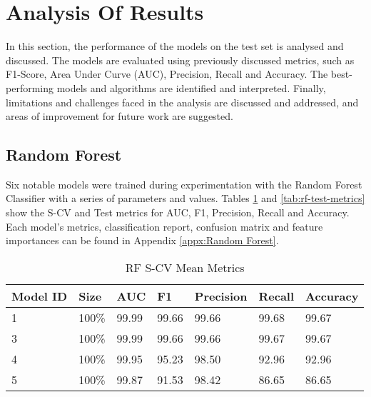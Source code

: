 
\section{Analysis Of Results}
 \label{sec: Analysis Of Results}

In this section, the performance of the models on the test set is analysed and discussed. The models are evaluated using previously discussed metrics, such as F1-Score, Area Under Curve (AUC), Precision, Recall and Accuracy. The best-performing models and algorithms are identified and interpreted. Finally, limitations and challenges faced in the analysis are discussed and addressed, and areas of improvement for future work are suggested.


\subsection{Random Forest}

Six notable models were trained during experimentation with the Random Forest Classifier with a series of parameters and values. Tables \ref{tab:rf-scv-metrics} and \ref{tab:rf-test-metrics} show the S-CV and Test metrics for AUC, F1, Precision, Recall and Accuracy. Each model's metrics, classification report, confusion matrix and feature importances can be found in Appendix \ref{appx:Random Forest}.
 
\begin{table}[H]
\centering
\caption{RF S-CV Mean Metrics}
\label{tab:rf-scv-metrics}
\begin{tabular}{|l|l|l|l|l|l|l|}
\hline
\textbf{Model ID} & \textbf{Size} & \textbf{AUC} & \textbf{F1} & \textbf{Precision} & \textbf{Recall} & \textbf{Accuracy}  \\ \hline
1 & 100\% & 99.99 & 99.66 & 99.66 & 99.68 & 99.67 \\ \hline
3 & 100\% & 99.99 & 99.66 & 99.66 & 	99.67 &	99.67 \\ \hline
4 & 100\% & 99.95 & 95.23 &	98.50 &	92.96 &	92.96 \\ \hline
5 & 100\% & 99.87 &	91.53 &	98.42 &	86.65 &	86.65 \\ \hline
\end{tabular}
\end{table}

